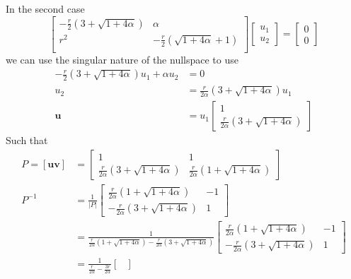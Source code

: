 \documentclass{article}
\begin{document}
\begin{solution}
In the second case 
\[
\begin{bmatrix}
-\frac{r}{2} \left( 3 + \sqrt{1 + 4\alpha}\right)	&	\alpha		\\
r^{2}														&	-\frac{r}{2}\left( \sqrt{1 + 4\alpha} + 1\right)	\\
\end{bmatrix}
\begin{bmatrix}
u_{1}\\
u_{2}
\end{bmatrix}
=
\begin{bmatrix}
0\\
0
\end{bmatrix}
\]
we can use the singular nature of the nullspace to use
\begin{align*}
-\frac{r}{2} \left( 3 + \sqrt{1 + 4\alpha}\right) u_{1} + \alpha u_{2} &= 0\\
u_{2} &= \frac{r}{2\alpha} \left( 3 + \sqrt{1 + 4\alpha}\right) u_{1}\\
\mathbf{u} &= u_{1}
\begin{bmatrix}
1\\
\frac{r}{2\alpha} \left( 3 + \sqrt{1 + 4\alpha}\right)
\end{bmatrix}
\end{align*}
Such that
\begin{align*}
P = \left[ \mathbf{u} \mathbf{v} \right] &=
\begin{bmatrix}
1 & 1 \\
\frac{r}{2\alpha} \left( 3 + \sqrt{1 + 4\alpha}\right)
&
\frac{r}{2\alpha} \left( 1 + \sqrt{1 + 4\alpha}\right)
\end{bmatrix}
\\
P^{-1} &= \frac{1}{|P|}
\begin{bmatrix}
\frac{r}{2\alpha} \left( 1 + \sqrt{1 + 4\alpha}\right) & -1 \\
-\frac{r}{2\alpha} \left( 3 + \sqrt{1 + 4\alpha}\right) & 1
\end{bmatrix}\\
&= \frac{1}{ \frac{r}{2\alpha} \left( 1 + \sqrt{1 + 4\alpha}\right) -\frac{r}{2\alpha} \left( 3 + \sqrt{1 + 4\alpha}\right) }
\begin{bmatrix}
\frac{r}{2\alpha} \left( 1 + \sqrt{1 + 4\alpha}\right) & -1 \\
-\frac{r}{2\alpha} \left( 3 + \sqrt{1 + 4\alpha}\right) & 1
\end{bmatrix}\\
&= \frac{1}{ \frac{r}{2\alpha} -\frac{3r}{2\alpha} }
\begin{bmatrix}

\end{bmatrix}
\end{align*}
\end{solution}
\end{document}
